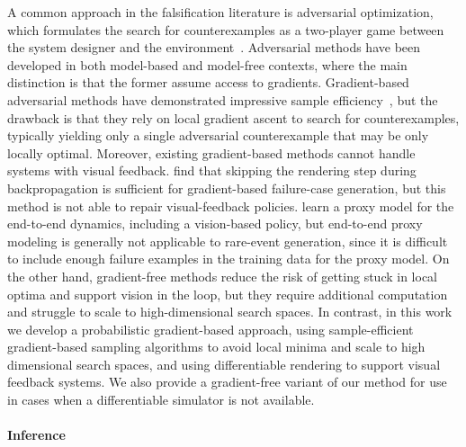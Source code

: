 A common approach in the falsification literature is adversarial optimization, which formulates the search for counterexamples as a two-player game between the system designer and the environment~\cite{dawsonRobustCounterexampleguidedOptimization2022b,dontiAdversariallyRobustLearning2021,yaghoubiGrayboxAdversarialTesting2018,corsoSurveyAlgorithmsBlackBox2021,xuSafeBenchBenchmarkingPlatform2022,riedmaierSurveyScenarioBasedSafety2020,okellyScalableEndtoEndAutonomous2018,corsoAdaptiveStressTesting2019,wangAdvSimGeneratingSafetyCritical2021,sunCornerCaseGeneration2021,zhongGuidedConditionalDiffusion2022,corsoInterpretableSafetyValidation2020a,zhangAdversarialRobustnessTrajectory2022,hanselmannKINGGeneratingSafetyCritical2022a}. Adversarial methods have been developed in both model-based and model-free contexts, where the main distinction is that the former assume access to gradients. Gradient-based adversarial methods have demonstrated impressive sample efficiency~\cite{dawsonRobustCounterexampleguidedOptimization2022b,dontiAdversariallyRobustLearning2021}, but the drawback is that they rely on local gradient ascent to search for counterexamples, typically yielding only a single adversarial counterexample that may be only locally optimal. Moreover, existing gradient-based methods cannot handle systems with visual feedback. \cite{hanselmannKINGGeneratingSafetyCritical2022a} find that skipping the rendering step during backpropagation is sufficient for gradient-based failure-case generation, but this method is not able to repair visual-feedback policies. \cite{sinhaNeuralBridgeSampling2020} learn a proxy model for the end-to-end dynamics, including a vision-based policy, but end-to-end proxy modeling is generally not applicable to rare-event generation, since it is difficult to include enough failure examples in the training data for the proxy model.
%
On the other hand, gradient-free methods reduce the risk of getting stuck in local optima and support vision in the loop, but they require additional computation and struggle to scale to high-dimensional search spaces. In contrast, in this work we develop a probabilistic gradient-based approach, using sample-efficient gradient-based sampling algorithms to avoid local minima and scale to high dimensional search spaces, and using differentiable rendering to support visual feedback systems. We also provide a gradient-free variant of our method for use in cases when a differentiable simulator is not available.

\paragraph{Inference}

